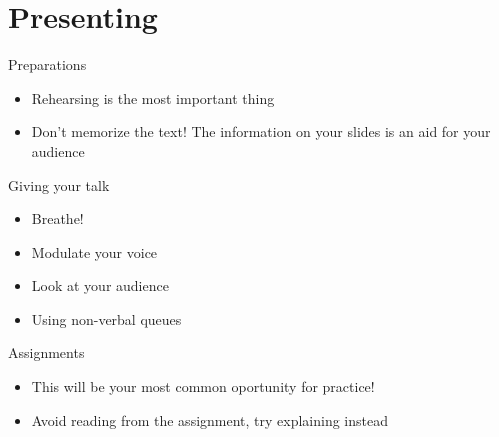 \documentclass{beamer}
\begin{document}
\section{Presenting}

\begin{frame}[t]{Preparations}
    \begin{itemize}
        \item Rehearsing is the most important thing
        \item Don't memorize the text! The information on your slides is an aid for your audience
    \end{itemize}
\end{frame}
\begin{frame}[t]{Giving your talk}
    \begin{itemize}
        \item Breathe!
        \item Modulate your voice
        \item Look at your audience
        \item Using non-verbal queues
    \end{itemize}
\end{frame}

\begin{frame}[t]{Assignments}
    \begin{itemize}
        \item This will be your most common oportunity for practice!
        \item Avoid reading from the assignment, try explaining instead
    \end{itemize}
\end{frame}
\end{document}
